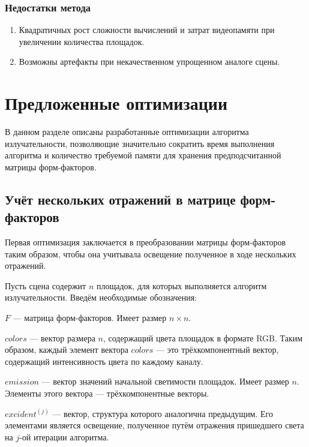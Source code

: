 \documentclass[12pt,fleqn]{article}
\begin{document}
\subsubsection{Недостатки метода}

\begin{enumerate}

\item Квадратичных рост сложности вычислений и затрат видеопамяти при увеличении количества площадок.

\item Возможны артефакты при некачественном упрощенном аналоге сцены.

\end{enumerate}

\pagebreak

\section{Предложенные оптимизации}

В данном разделе описаны разработанные оптимизации алгоритма излучательности, позволяющие значительно сократить время выполнения алгоритма и количество требуемой памяти для хранения предподсчитанной матрицы форм-факторов.

\subsection{Учёт нескольких отражений в матрице форм-факторов}

Первая оптимизация заключается в преобразовании матрицы форм-факторов таким образом, чтобы она учитывала освещение полученное в ходе нескольких отражений.

Пусть сцена содержит $n$ площадок, для которых выполняется алгоритм излучательности. Введём необходимые обозначения:

$F$ --- матрица форм-факторов. Имеет размер $n \times n$.

$colors$ --- вектор размера $n$, содержащий цвета площадок в формате RGB. Таким образом, каждый элемент вектора $colors$ --- это трёхкомпонентный вектор, содержащий интенсивность цвета по каждому каналу.

$emission$ --- вектор значений начальной светимости площадок. Имеет размер $n$. Элементы этого вектора --- трёхкомпонентные векторы.

$excident^{(j)}$ --- вектор, структура которого аналогична предыдущим. Его элементами является освещение, полученное путём отражения пришедшего света на $j$-ой итерации алгоритма.
\end{document}
